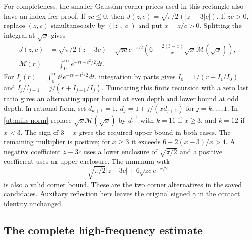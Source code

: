 For completeness, the smaller Gaussian corner prices used in this
rectangle also have an index-free proof. If $zc\le0$, then
$J(z,c)=\sqrt{\pi/2}(|z|+3|c|)$.
If $zc>0$, replace $(z,c)$ simultaneously by $(|z|,|c|)$ and put
$x=z/c>0$. Splitting the integral at $\sqrt x$ gives
\begin{equation}\label{ut:mills-norm}
\begin{aligned}
 J(z,c)&=\sqrt{\pi/2}(z-3c)+\sqrt{zc}e^{-x/2}
       \left(6+\frac{2(3-x)}x\sqrt x\,\mathcal M(\sqrt x)\right),\\
 \mathcal M(r)&=\int_0^\infty e^{-rt-t^2/2}dt.
\end{aligned}
\end{equation}
For $I_j(r)=\int_0^\infty t^je^{-rt-t^2/2}dt$, integration by parts
gives $I_0=1/(r+I_1/I_0)$ and
$I_j/I_{j-1}=j/(r+I_{j+1}/I_j)$.
Truncating this finite recursion with a zero last ratio gives an
alternating upper bound at even depth and lower bound at odd depth.
In rational form, set $d_{k+1}=1$,
$d_j=1+j/(xd_{j+1})$ for $j=k,\ldots,1$.
In \eqref{ut:mills-norm} replace
$\sqrt x\mathcal M(\sqrt x)$ by $d_1^{-1}$ with $k=11$ if
$x\ge3$, and $k=12$ if $x<3$.
The sign of $3-x$ gives the required upper bound in both cases.
The remaining multiplier is positive; for $x\ge3$ it exceeds
$6-2(x-3)/x>4$.
A negative coefficient $z-3c$ uses a lower enclosure of
$\sqrt{\pi/2}$ and a positive coefficient uses an upper enclosure.
The minimum with
\[
 \sqrt{\pi/2}|z-3c|+6\sqrt{zc}e^{-x/2}
\]
is also a valid corner bound. These are the two corner alternatives
in the saved candidates. Auxiliary reflection here leaves the original
signed $\gamma$ in the contact identity unchanged.

\subsection{The complete high-frequency estimate}

